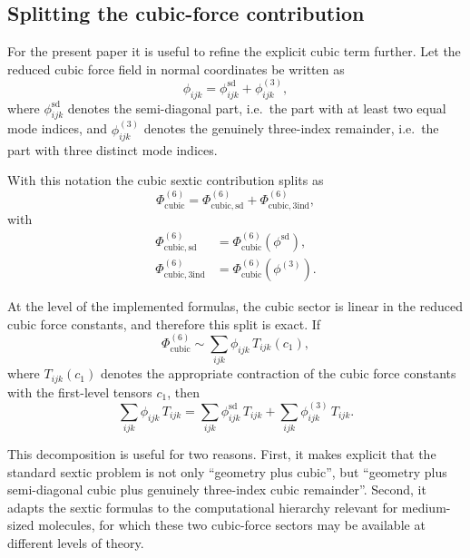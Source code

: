 \documentclass[journal=jacsat,manuscript=article]{achemso}
\begin{document}
\subsection{Splitting the cubic-force contribution}

For the present paper it is useful to refine the explicit cubic term further.
Let the reduced cubic force field in normal coordinates be written as
\begin{equation}
\phi_{ijk}
=
\phi^{\mathrm{sd}}_{ijk}
+
\phi^{(3)}_{ijk},
\label{eq:app_phi3_split}
\end{equation}
where $\phi^{\mathrm{sd}}_{ijk}$ denotes the semi-diagonal part, i.e.\ the
part with at least two equal mode indices, and $\phi^{(3)}_{ijk}$ denotes the
genuinely three-index remainder, i.e.\ the part with three distinct mode
indices.

With this notation the cubic sextic contribution splits as
\begin{equation}
\Phi^{(6)}_{\mathrm{cubic}}
=
\Phi^{(6)}_{\mathrm{cubic,sd}}
+
\Phi^{(6)}_{\mathrm{cubic,3ind}},
\label{eq:app_sextic_cubic_split}
\end{equation}
with
\begin{align}
\Phi^{(6)}_{\mathrm{cubic,sd}}
&=
\Phi^{(6)}_{\mathrm{cubic}}(\phi^{\mathrm{sd}}),
\\
\Phi^{(6)}_{\mathrm{cubic,3ind}}
&=
\Phi^{(6)}_{\mathrm{cubic}}(\phi^{(3)}).
\end{align}

At the level of the implemented formulas, the cubic sector is linear in the
reduced cubic force constants, and therefore this split is exact. If
\begin{equation}
\Phi^{(6)}_{\mathrm{cubic}}
\sim
\sum_{ijk}\phi_{ijk}\,T_{ijk}(c_1),
\end{equation}
where $T_{ijk}(c_1)$ denotes the appropriate contraction of the cubic force
constants with the first-level tensors $c_1$, then
\begin{equation}
\sum_{ijk}\phi_{ijk}\,T_{ijk}
=
\sum_{ijk}\phi^{\mathrm{sd}}_{ijk}\,T_{ijk}
+
\sum_{ijk}\phi^{(3)}_{ijk}\,T_{ijk}.
\label{eq:app_sextic_cubic_linear_split}
\end{equation}

This decomposition is useful for two reasons. First, it makes explicit that
the standard sextic problem is not only ``geometry plus cubic'', but
``geometry plus semi-diagonal cubic plus genuinely three-index cubic
remainder''. Second, it adapts the sextic formulas to the computational
hierarchy relevant for medium-sized molecules, for which these two cubic-force
sectors may be available at different levels of theory.
\end{document}
